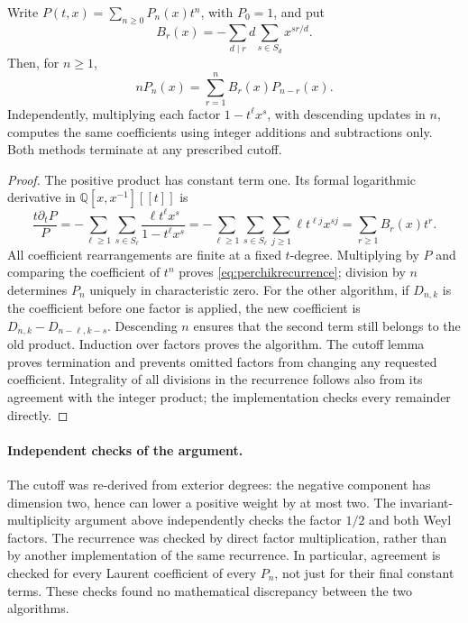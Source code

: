 \begin{proposition}\ours\quad
Write \(P(t,x)=\sum_{n\geq0}P_n(x)t^n\), with \(P_0=1\), and put
\[
 B_r(x)=-\sum_{d\mid r}d\sum_{s\in S_d}x^{sr/d}.
\]
Then, for \(n\geq1\),
\begin{equation}\label{eq:perchikrecurrence}
 nP_n(x)=\sum_{r=1}^n B_r(x)P_{n-r}(x).
\end{equation}
Independently, multiplying each factor \(1-t^\ell x^s\), with descending
updates in \(n\), computes the same coefficients using integer additions
and subtractions only. Both methods terminate at any prescribed cutoff.
\end{proposition}
\begin{proof}
The positive product has constant term one. Its formal logarithmic
derivative in \(\mathbb Q[x,x^{-1}][[t]]\) is
\[
 \frac{t\partial_t P}{P}
 =-\sum_{\ell\geq1}\sum_{s\in S_\ell}
       \frac{\ell t^\ell x^s}{1-t^\ell x^s}
 =-\sum_{\ell\geq1}\sum_{s\in S_\ell}\sum_{j\geq1}
       \ell t^{\ell j}x^{sj}
 =\sum_{r\geq1}B_r(x)t^r.
\]
All coefficient rearrangements are finite at a fixed \(t\)-degree.
Multiplying by \(P\) and comparing the coefficient of \(t^n\) proves
\eqref{eq:perchikrecurrence}; division by \(n\) determines \(P_n\)
uniquely in characteristic zero. For the other algorithm, if \(D_{n,k}\)
is the coefficient before one factor is applied, the new coefficient is
\(D_{n,k}-D_{n-\ell,k-s}\). Descending \(n\) ensures that the second
term still belongs to the old product. Induction over factors proves the
algorithm. The cutoff lemma proves termination and prevents omitted
factors from changing any requested coefficient. Integrality of all
divisions in the recurrence follows also from its agreement with the
integer product; the implementation checks every remainder directly.
\end{proof}

\paragraph{Independent checks of the argument.}
The cutoff was re-derived from exterior degrees: the negative component
has dimension two, hence can lower a positive weight by at most two.
The invariant-multiplicity argument above independently checks the
factor \(1/2\) and both Weyl factors. The recurrence was checked by
direct factor multiplication, rather than by another implementation of
the same recurrence. In particular, agreement is checked for every
Laurent coefficient of every \(P_n\), not just for their final constant
terms. These checks found no mathematical discrepancy between the two
algorithms.

